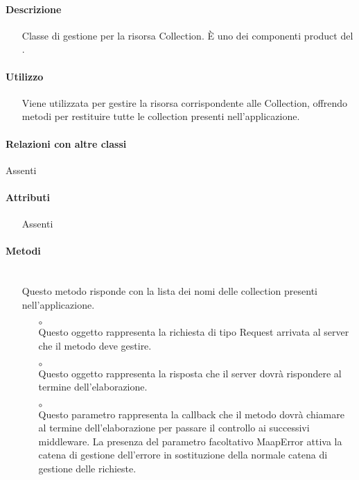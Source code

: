 \paragraph*{Descrizione}
\begin{itemize}
\item[] Classe di gestione per la risorsa Collection. È uno dei componenti product del  .
\end{itemize}

\paragraph*{Utilizzo}
\begin{itemize}
\item[] Viene utilizzata per gestire la risorsa corrispondente alle Collection, offrendo metodi per restituire tutte le collection presenti nell'applicazione.
\end{itemize}

\paragraph*{Relazioni con altre classi}
Assenti

\paragraph*{Attributi}
\begin{itemize}
\item[] Assenti
\end{itemize}

\paragraph*{Metodi}
\begin{itemize}
\item[]  \\ Questo metodo risponde con la lista dei nomi delle collection presenti nell'applicazione.
\begin{itemize}\addtolength{\itemsep}{-0.5\baselineskip}
\item[$\circ$]  \\ Questo oggetto rappresenta la richiesta di tipo Request arrivata al server che il metodo deve gestire.
\item[$\circ$]  \\ Questo oggetto rappresenta la risposta che il server dovrà rispondere al termine dell'elaborazione.
\item[$\circ$]  \\ Questo parametro rappresenta la callback che il metodo dovrà chiamare al termine dell'elaborazione per passare il controllo ai successivi middleware. La presenza del parametro facoltativo MaapError attiva la catena di gestione dell'errore in sostituzione della normale catena di gestione delle richieste.
\end{itemize}
\end{itemize}


